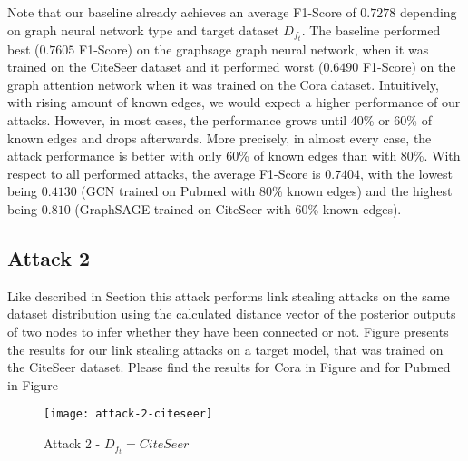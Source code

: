             Note that our baseline already achieves an average F1-Score of $0.7278$ depending on graph neural network type and target dataset $D_{f_t}$.
            The baseline performed best ($0.7605$ F1-Score) on the graphsage graph neural network, when it was trained on the  CiteSeer dataset and it performed worst ($0.6490$ F1-Score) on the graph attention network when it was trained on the Cora dataset.
            Intuitively, with rising amount of known edges, we would expect a higher performance of our attacks.
            However, in most cases, the performance grows until 40\% or 60\% of known edges and drops afterwards.
            More precisely, in almost every case, the attack performance is better with only 60\% of known edges than with 80\%.
            With respect to all performed attacks, the average F1-Score is $0.7404$, with the lowest being $0.4130$ (GCN trained on Pubmed with 80\% known edges) and the highest being $0.810$ (GraphSAGE trained on CiteSeer with 60\% known edges).

        \subsection*{Attack 2}
            Like described in Section  this attack performs link stealing attacks on the same dataset distribution using the calculated distance vector of the posterior outputs of two nodes to infer whether they have been connected or not. 
            Figure  presents the results for our link stealing attacks on a target model, that was trained on the CiteSeer dataset.
            Please find the results for Cora in Figure  and for Pubmed in Figure 

            \begin{figure}[h]
                \begin{center}
                    \texttt{[image: attack-2-citeseer]}
                    \caption{Attack 2 - $D_{f_t} = CiteSeer$}
                    \label{figure:eval-att2-citeseer}
                \end{center}
            \end{figure}

